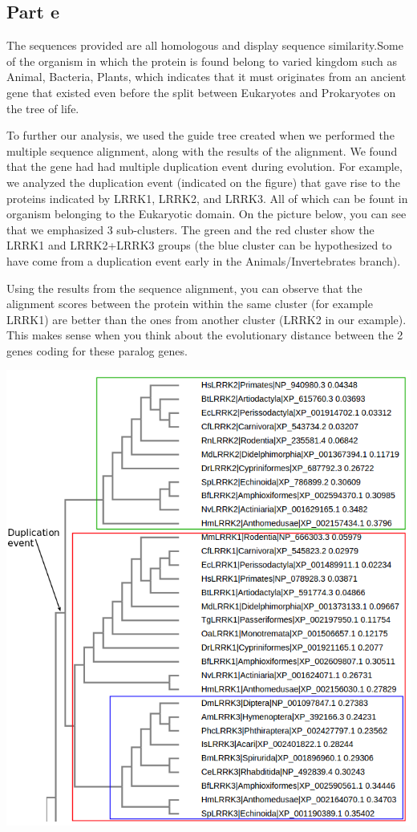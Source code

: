 \documentclass[11pt, a4paper,titlepage]{article}
\begin{document}
\subsection*{Part e}

The sequences provided are all homologous and display sequence
similarity.Some of the organism in which the protein is found belong
to varied kingdom such as Animal, Bacteria, Plants, which indicates
that it must originates from an ancient gene that existed even before
the split between Eukaryotes and Prokaryotes on the tree of life.

To further our analysis, we used the guide tree created when we
performed the multiple sequence alignment, along with the results of
the alignment. We found that the gene had had multiple duplication
event during evolution. For example, we analyzed the duplication event
(indicated on the figure) that gave rise to the proteins indicated by
LRRK1, LRRK2, and LRRK3. All of which can be fount in organism
belonging to the Eukaryotic domain. On the picture below, you can see
that we emphasized 3 sub-clusters. The green and the red cluster show
the LRRK1 and LRRK2+LRRK3 groups (the blue cluster can be hypothesized
to have come from a duplication event early in the
Animals/Invertebrates branch).

Using the results from the sequence alignment, you can observe that
the alignment scores between the protein within the same cluster (for
example LRRK1) are better than the ones from another cluster (LRRK2 in
our example). This makes sense when you think about the evolutionary
distance between the 2 genes coding for these paralog genes.

\includegraphics[width=17cm]{./Figures/5e.png}
\end{document}
